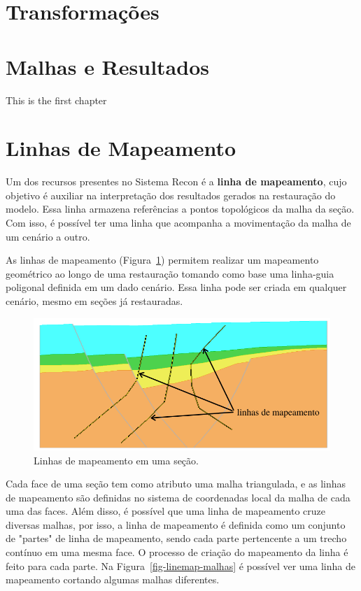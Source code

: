 \section{Transformações}

\section{Malhas e Resultados}

This is the first chapter

\section{Linhas de Mapeamento}

Um dos recursos presentes no Sistema Recon é a \textbf{linha de mapeamento}, cujo objetivo é auxiliar na interpretação dos resultados gerados na restauração do modelo. Essa linha armazena referências a pontos topológicos da malha da seção. Com isso, é possível ter uma linha que acompanha a movimentação da malha de um cenário a outro.

As linhas de mapeamento (Figura~\ref{fig-linemap}) permitem realizar um mapeamento geométrico ao longo de uma restauração tomando como base uma linha-guia poligonal definida em um dado cenário. Essa linha pode ser criada em qualquer cenário, mesmo em seções já restauradas.

\begin{figure} [h]
  \begin{center}
    \includegraphics[width=400pt]{images/fig-linhas-de-mapeamento-ed}
    \caption{Linhas de mapeamento em uma seção.}\label{fig-linemap}
  \end{center}
\end{figure}

Cada face de uma seção tem como atributo uma malha triangulada, e as linhas de mapeamento são definidas no sistema de coordenadas local da malha de cada uma das faces. Além disso, é possível que uma linha de mapeamento cruze diversas malhas, por isso, a linha de mapeamento é definida como um conjunto de "partes" de linha de mapeamento, sendo cada parte pertencente a um trecho contínuo em uma mesma face. O processo de criação do mapeamento da linha é feito para cada parte. Na Figura~\ref{fig-linemap-malhas} é possível ver uma linha de mapeamento cortando algumas malhas diferentes.

